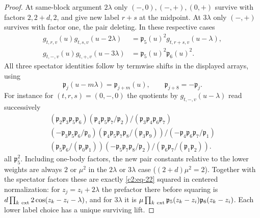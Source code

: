 \begin{proof}
At same-block argument \(2\lambda\) only \((-,0),(-,+),(0,+)\) survive with factors \(2,2+d,2\), and give new label \(r+s\) at the midpoint. At \(3\lambda\) only \((-,+)\) survives with factor one, the pair deleting. In these respective cases
\[
\begin{split}
 g_{t,r,v}(u)g_{t,s,v}(u-2\lambda)&=\mathfrak p_5(u)^2g_{t,r+s,v}(u-\lambda),\\
 g_{t,-,v}(u)g_{t,+,v}(u-3\lambda)&=\mathfrak p_5(u)^2\mathfrak p_6(u)^2 .
\end{split}
\]
All three spectator identities follow by termwise shifts in the displayed arrays, using
\[
 \mathfrak p_j(u-m\lambda)=\mathfrak p_{j+m}(u),\qquad
 \mathfrak p_{j+8}=-\mathfrak p_j.
\] For instance for \((t,r,s)=(0,-,0)\) the quotients by \(g_{t,-,v}(u-\lambda)\) read successively
\[
\begin{gathered}
(\mathfrak p_2\mathfrak p_3\mathfrak p_5\mathfrak p_6)(\mathfrak p_4\mathfrak p_5\mathfrak p_7/\mathfrak p_2)/(\mathfrak p_3\mathfrak p_4\mathfrak p_6\mathfrak p_7) \\
(-\mathfrak p_3\mathfrak p_5\mathfrak p_6/\mathfrak p_0)(\mathfrak p_4\mathfrak p_5\mathfrak p_7\mathfrak p_8/(\mathfrak p_3\mathfrak p_9))/(-\mathfrak p_4\mathfrak p_6\mathfrak p_7/\mathfrak p_1) \\
(\mathfrak p_5\mathfrak p_6/(\mathfrak p_0\mathfrak p_1))(-\mathfrak p_5\mathfrak p_7\mathfrak p_8/\mathfrak p_2)/(\mathfrak p_6\mathfrak p_7/(\mathfrak p_1\mathfrak p_2)) .
\end{gathered}
\]
all \(\mathfrak p_5^2\). Including one-body factors, the new pair constants relative to the lower weights are always \(2\) or \(\mu^2\) in the \(2\lambda\) or \(3\lambda\) case (\((2+d)\mu^2=2\)). Together with the spectator factors these are exactly \eqref{c2:eq-22} squared in centered normalization: for \(z_j=z_i+2\lambda\) the prefactor there before squaring is \(d\prod_{k\ {\rm ext}}2\cos(z_k-z_i-\lambda)\), and for \(3\lambda\) it is \(\mu\prod_{k\ {\rm ext}}\mathfrak p_5(z_k-z_i)\mathfrak p_6(z_k-z_i)\). Each lower label choice has a unique surviving lift.


\end{proof}
